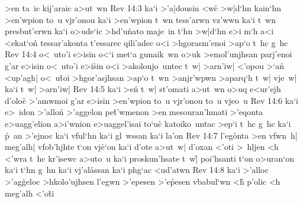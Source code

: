 >en
ta~ic
kij'araic
a>ut~wn\bibvsend
\vs Rev 14:3
ka`i
>'a|dousin
<w\r{c}
>w|d`hn
kain`hn
>en'wpion
to~u
vjr'onou
ka`i
>en'wpion
t~wn
tess'arwn
vz'wwn
ka`i
t~wn
presbut'erwn
ka`i
o>ude`ic
>hd'u\r{n}ato
maje~in
t`hn
>w|d`hn
e>i
m`h
a<i
<ekat`on\r{}
tessar'akonta
t'essarec
qili'adec
o<i
>hgorasm'enoi
>ap`o
t~hc
g~hc\bibvsend
\vs Rev 14:4
o<~uto'i
e>isin
o<`i
met`a
gunaik~wn
o>uk
>emol'unjhsan
parj'enoi
g'ar
e>isin
o<~uto'i
e>i\r{s}in
o<i
>akoloujo~untec
t~w|
>arn'iw|
<'opou
>`a\r{n}
<up'agh|
o<~u\r{t}oi
>hgor'asjhsan
>ap`o
t~wn
>anjr'wpwn
>aparq`h
t~w|
vje~w|
ka`i
t~w|
>arn'iw|\bibvsend
\vs Rev 14:5
ka`i
>en\r{}
t~w|
st'omati
a>ut~wn
o>uq
e<ur'ejh
d'oloc\r{}
>'amwmoi
g'ar
e>isin
>en'wpion
to~u
vjr'onou
to~u
vjeo~u\bibvsend
\vs Rev 14:6
ka`i
e>~idon
>'allo\r{n}
>'aggelon
pe\r{t}'wmenon
>en
mesouran'hmati
>'eqonta
e>uagg'elion
a>i'wnion
e>uaggel'isai
to`uc\r{}
katoiko~untac
>ep`i
t~hc
g~hc
ka`i
\r{p}~an
>'ejnoc
ka`i
vful`hn
ka`i
gl~wssan
ka`i
la'on\bibvsend
\vs Rev 14:7
l'eg\r{o}nta
>en
vfwn~h|
meg'alh|
vfob'hjhte
t`on
vj\r{e}`on
ka`i
d'ote
a>ut~w|
d'oxan
<'oti
>~hljen
<h
<'wra
t~hc
kr'isewc
a>uto~u
ka`i
proskun'hsate
t~w|\r{}
poi'hsanti
t`on
o>uran`on
ka`i
t`hn
g~hn
ka`i
vj'al\r{a}ssan
ka`i
phg`ac
<ud'atwn\bibvsend
\vs Rev 14:8
ka`i
>'alloc
>'ag\r{g}eloc
>hkolo'ujhsen
l'egwn
>'epesen
>'e\r{p}esen
vbabul`wn
<h\r{}
p'olic
<h
meg'alh
<'o\r{t}i
